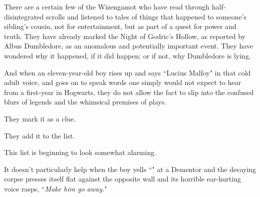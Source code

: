 There are a certain few of the Wizengamot who have read through half-disintegrated scrolls and listened to tales of things that happened to someone's sibling's cousin, not for entertainment, but as part of a quest for power and truth. They have already marked the Night of Godric's Hollow, as reported by Albus Dumbledore, as an anomalous and potentially important event. They have wondered why it happened, if it did happen; or if not, why Dumbledore is lying.

And when an eleven-year-old boy rises up and says ``Lucius Malfoy" in that cold adult voice, and goes on to speak words one simply would not expect to hear from a first-year in Hogwarts, they do not allow the fact to slip into the confused blurs of legends and the whimsical premises of plays.

They mark it as a clue.

They add it to the list.

This list is beginning to look somewhat alarming.

It doesn't particularly help when the boy yells ``" at a Dementor and the decaying corpse presses itself flat against the opposite wall and its horrible ear-hurting voice rasps, ``\emph{Make him go away.}"

